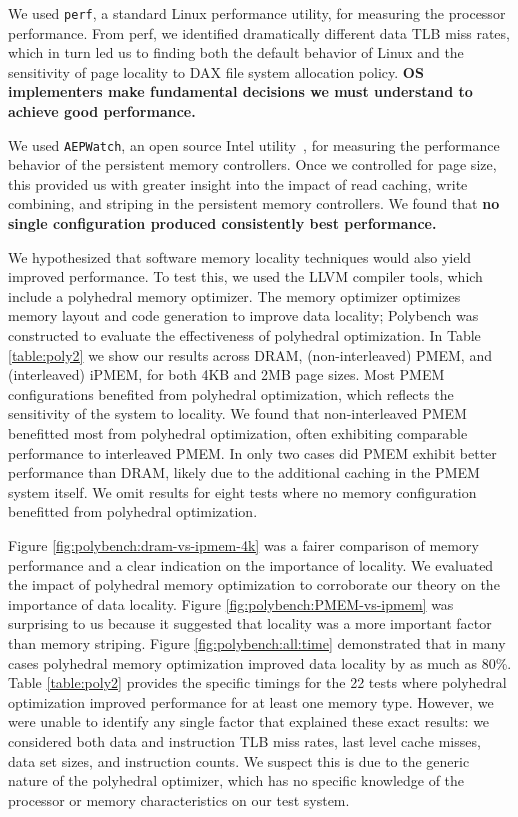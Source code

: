 We used \texttt{perf}, a standard Linux performance utility, for measuring the processor performance.  From perf, we identified dramatically different data TLB miss rates, which in turn led us to finding both the default behavior of Linux and the sensitivity of page locality to DAX file system allocation policy.  \textbf{OS implementers make fundamental decisions we must understand to achieve good performance.}

We used \texttt{AEPWatch}, an open source Intel utility~\cite{IntelAEPWatch}, for measuring the performance behavior of the persistent memory controllers. Once we controlled for page size, this provided us with greater insight into the impact of read caching, write combining, and striping in the persistent memory controllers.  We found that \textbf{no single configuration produced consistently best performance.}

We hypothesized that software memory locality techniques would also yield improved performance.  To test this, we used the LLVM compiler tools, which include a polyhedral memory optimizer. The memory optimizer optimizes memory layout and code generation to improve data locality; Polybench was constructed to evaluate the effectiveness of polyhedral optimization.  In Table \ref{table:poly2} we show our results across DRAM, (non-interleaved) PMEM, and (interleaved) iPMEM, for both 4KB and 2MB page sizes.  Most PMEM configurations benefited from polyhedral optimization, which reflects the sensitivity of the system to locality. We found that non-interleaved PMEM benefitted most from polyhedral optimization, often exhibiting comparable performance to interleaved PMEM.  In only two cases did PMEM exhibit better performance than DRAM, likely due to the additional caching in the PMEM system itself. We omit results for eight tests where no memory configuration benefitted from polyhedral optimization.

Figure \ref{fig:polybench:dram-vs-ipmem-4k} was a fairer comparison of memory performance and a clear indication on the importance of locality.  We evaluated the impact of polyhedral memory optimization to corroborate our theory on the importance of data locality.  Figure \ref{fig:polybench:PMEM-vs-ipmem} was surprising to us because it suggested that locality was a more important factor than memory striping. Figure \ref{fig:polybench:all:time} demonstrated that in many cases polyhedral memory optimization improved data locality by as much as 80\%.  Table \ref{table:poly2} provides the specific timings for the 22 tests where polyhedral optimization improved performance for at least one memory type.  However, we were unable to identify any single factor that explained these exact results: we considered both data and instruction TLB miss rates, last level cache misses, data set sizes, and instruction counts. We suspect this is due to the generic nature of the polyhedral optimizer, which has no specific knowledge of the processor or memory characteristics on our test system.

